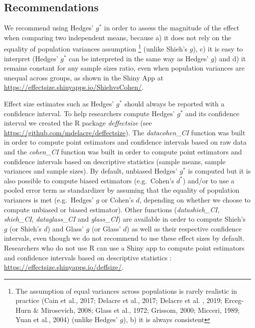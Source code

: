 \documentclass[
  english,
  man,floatsintext]{apa6}
\begin{document}
\hypertarget{recommendations}{%
\subsection{Recommendations}\label{recommendations}}

We recommend using Hedges' \(g^*\) in order to assess the magnitude of the effect when comparing two independent means, because a) it does not rely on the equality of population variances assumption \footnote{The assumption of equal variances across populations is rarely realistic in practice (Cain et al., 2017; Delacre et al., 2017; Delacre et al. , 2019; Erceg-Hurn $\&$ Mirosevich, 2008; Glass et al., 1972; Grissom, 2000; Micceri, 1989; Yuan et al., 2004) (unlike Hedges' $g$), b) it is always consistent} (unlike Shieh's \(g\)), c) it is easy to interpret (Hedges' \(g^*\) can be interpreted in the same way as Hedges' \(g\)) and d) it remains constant for any sample sizes ratio, even when population variances are unequal across groups, as shown in the Shiny App at \url{https://effectsize.shinyapps.io/ShiehvsCohen/}.

Effect size estimates such as Hedges' \(g^*\) should always be reported with a confidence interval. To help researchers compute Hedges' \(g^*\) and its confidence interval we created the R package \emph{deffectsize} (see \url{https://github.com/mdelacre/deffectsize}). The \emph{datacohen\_CI} function was built in order to compute point estimators and confidence intervals based on raw data and the \emph{cohen\_CI} function was built in order to compute point estimators and confidence intervals based on descriptive statistics (sample means, sample variances and sample sizes). By default, unbiased Hedges' \(g^*\) is computed but it is also possible to compute biased estimators (e.g.~Cohen's \(d^*\)) and/or to use a pooled error term as standardizer by assuming that the equality of population variances is met (e.g.~Hedges' \(g\) or Cohen's \(d\), depending on whether we choose to compute unbiased or biased estimator). Other functions (\emph{datashieh\_CI}, \emph{shieh\_CI}, \emph{dataglass\_CI} and \emph{glass\_CI}) are available in order to compute Shieh's \(g\) (or Shieh's \(d\)) and Glass' \(g\) (or Glass' \(d\)) as well as their respective confidence intervals, even though we do not recommend to use these effect sizes by default. Researchers who do not use R can use a Shiny app to compute point estimators and confidence intervals based on descriptive statistics : \url{https://effectsize.shinyapps.io/deffsize/}.
\end{document}
